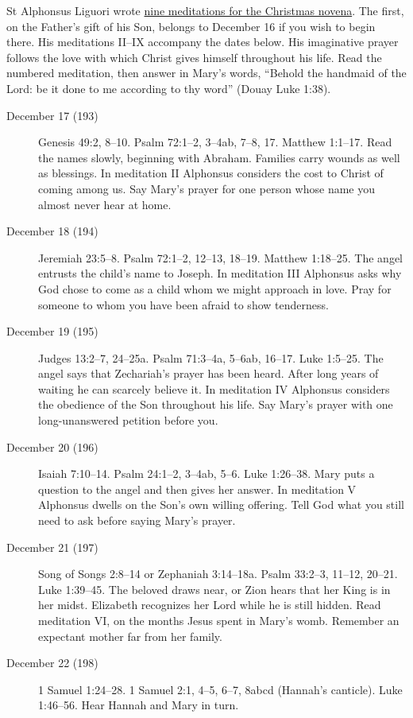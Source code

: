 St Alphonsus Liguori wrote \href{https://archive.org/details/incarnationofjes04liguuoft/page/214/mode/1up}{nine meditations for the Christmas novena}.
The first, on the Father's gift of his Son, belongs to December 16 if you
wish to begin there. His meditations II--IX accompany the dates below.
His imaginative prayer follows the love with which Christ gives himself
throughout his life. Read the numbered meditation, then answer in Mary's
words, “Behold the handmaid of the Lord: be it done to me according to
thy word” (Douay Luke 1:38).

\begin{description}
\item[December 17 (193)] Genesis 49:2, 8--10. Psalm 72:1--2, 3--4ab,
7--8, 17. Matthew 1:1--17. Read the names slowly, beginning with
Abraham. Families carry wounds as well as blessings. In meditation II
Alphonsus considers the cost to Christ of coming among us. Say Mary's
prayer for one person whose name you almost never hear at home.
\item[December 18 (194)] Jeremiah 23:5--8. Psalm 72:1--2, 12--13,
18--19. Matthew 1:18--25. The angel entrusts the child's name to
Joseph. In meditation III Alphonsus asks why God chose to come as a
child whom we might approach in love. Pray for someone to whom you have
been afraid to show tenderness.
\item[December 19 (195)] Judges 13:2--7, 24--25a. Psalm 71:3--4a,
5--6ab, 16--17. Luke 1:5--25. The angel says that Zechariah's prayer
has been heard. After long years of waiting he can scarcely believe it.
In meditation IV Alphonsus considers the obedience of the Son throughout
his life. Say Mary's prayer with one long-unanswered petition before you.
\item[December 20 (196)] Isaiah 7:10--14. Psalm 24:1--2, 3--4ab, 5--6.
Luke 1:26--38. Mary puts a question to the angel and then gives her
answer. In meditation V Alphonsus dwells on the Son's own willing
offering. Tell God what you still need to ask before saying Mary's prayer.
\item[December 21 (197)] Song of Songs 2:8--14 or Zephaniah 3:14--18a.
Psalm 33:2--3, 11--12, 20--21. Luke 1:39--45. The beloved draws near,
or Zion hears that her King is in her midst. Elizabeth recognizes her
Lord while he is still hidden. Read meditation VI, on the months Jesus
spent in Mary's womb. Remember an expectant mother far from her family.
\item[December 22 (198)] 1 Samuel 1:24--28. 1 Samuel 2:1, 4--5, 6--7,
8abcd (Hannah's canticle). Luke 1:46--56. Hear Hannah and Mary in turn.

\end{description}
